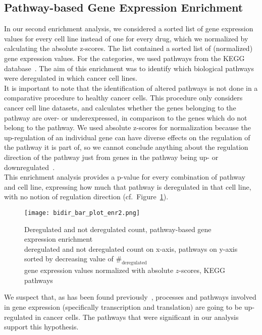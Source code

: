 \subsection{Pathway-based Gene Expression Enrichment}\label{subsec:bidir_enr2}
In our second enrichment analysis, we considered a sorted list of gene expression values for every cell line instead of one for every drug, which we normalized by calculating the absolute z-scores. The list contained a sorted list of (normalized) gene expression values. For the categories, we used pathways from the KEGG database~\cite{kegg_website}. The aim of this enrichment was to identify which biological pathways were deregulated in which cancer cell lines.\\
It is important to note that the identification of altered pathways is not done in a comparative procedure to healthy cancer cells. This procedure only considers cancer cell line datasets, and calculates whether the genes belonging to the pathway are over- or underexpressed, in comparison to the genes which do not belong to the pathway. We used absolute z-scores for normalization because the up-regulation of an individual gene can have diverse effects on the regulation of the pathway it is part of, so we cannot conclude anything about the regulation direction of the pathway just from genes in the pathway being up- or downregulated~\cite{systems_biology_biological_circuits}.\\
This enrichment analysis provides a p-value for every combination of pathway and cell line, expressing how much that pathway is deregulated in that cell line, with no notion of regulation direction (cf.\ Figure~\ref{fig:bidir_enr2}).\\
\begin{figure}
    \centering
    \texttt{[image: bidir\_bar\_plot\_enr2.png]}
    \caption{Deregulated and not deregulated count, pathway-based gene expression enrichment\\deregulated and not deregulated count on x-axis, pathways on y-axis\\sorted by decreasing value of $\#_{\text{deregulated}}$\\gene expression values normalized with absolute $z$-scores, KEGG pathways}
    \label{fig:bidir_enr2}
\end{figure}
We suspect that, as has been found previously~\cite{transcription_translation_deregulation_cancer}, processes and pathways involved in gene expression (specifically transcription and translation) are going to be up-regulated in cancer cells. The pathways that were significant in our analysis support this hypothesis.\\
